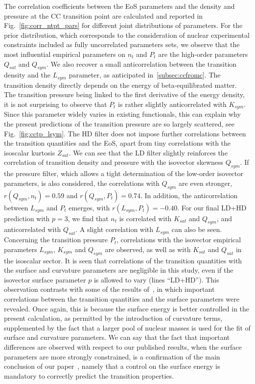 The correlation coefficients between the EoS parameters and the density and
pressure at the CC transition point are calculated and reported in 
Fig.~\ref{fig:corr_ntpt_pars} for different joint distributions of parameters.
For the prior distribution, which corresponds to the consideration of nuclear
experimental constraints included as fully uncorrelated parameters sets, we 
observe that the most influential empirical parameters on $n_t$ and $P_t$ are 
the high-order parameters $Q_{sat}$ and $Q_{sym}$.
We also recover a small anticorrelation between the transition density and the 
$L_{sym}$ parameter, as anticipated in~\ref{subsec:ccfromc}. The transition 
density directly depends on the energy of beta-equilibrated matter. The 
transition pressure being linked to the first derivative of the energy density, 
it is not surprising to observe that $P_t$ is rather slightly anticorrelated 
with $K_{sym}$. Since this parameter widely varies in existing functionals, 
this can explain why the present predictions of the transition pressure are so 
largely scattered, see Fig.~\ref{fig:cctp_lsym}.
The HD filter does not impose further correlations between the transition
quantities and the EoS, apart from tiny 
correlations with the isoscalar kurtosis $Z_{sat}$. We can see that the LD 
filter slightly reinforces the correlation of transition density and pressure 
with the isovector skewness $Q_{sym}$. If the pressure filter, which allows a
tight determination of the low-order isovector parameters, is also
considered, the correlations with $Q_{sym}$ are even stronger,
$r(Q_{sym},n_t)=0.59$ and $r(Q_{sym},P_t)=0.74$. In addition, the 
anticorrelation between $L_{sym}$ and $P_t$ emerges, with 
$r(L_{sym},P_t)=-0.40$. For our final LD+HD prediction with $p=3$, we find that
$n_t$ is correlated with $K_{sat}$ and $Q_{sym}$, and anticorrelated with
$Q_{sat}$. A slight correlation with $L_{sym}$ can also be seen. Concerning the
transition pressure $P_t$, correlations with the isovector empirical parameters
$L_{sym}$, $K_{sym}$ and $Q_{sym}$ are observed, as well as with 
$K_{sat}$ and $Q_{sat}$ in the isoscalar sector.
It is seen that correlations of the transition quantities with the surface and
curvature parameters are negligible in this study, even if the isovector
surface parameter $p$ is allowed to vary (lines ``LD+HD''). This observation
contrasts with some of the results of~\cite{Carreau2019cc}, in which 
important correlations between the transition quantities and the surface
parameters were revealed. Once again, this is because the surface energy is
better controlled in the present calculation, as permitted by the introduction 
of curvature terms, supplemented by the fact that a larger pool of nuclear 
masses is used for the fit of surface and curvature parameters. 
We can say that the fact that important differences are observed with respect
to our published results, when the surface parameters are more strongly
constrained, is a confirmation of the main conclusion of our
paper~\cite{Carreau2019cc}, namely that a control on the surface energy is
mandatory to correctly predict the transition properties.

